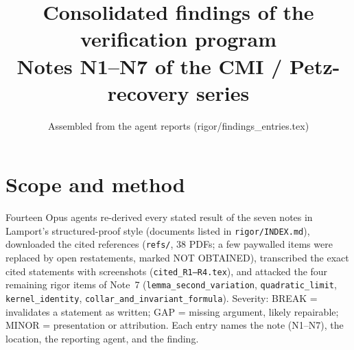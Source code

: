 \documentclass[11pt]{article}
\title{Consolidated findings of the verification program\\[0.3em]\large Notes N1--N7 of the CMI / Petz-recovery series}\author{}\date{Assembled from the agent reports (rigor/findings\_entries.tex)}
\begin{document}
\maketitle\tableofcontents\clearpage
\section{Scope and method}
Fourteen Opus agents re-derived every stated result of the seven notes in Lamport's structured-proof style (documents listed in \texttt{rigor/INDEX.md}), downloaded the cited references (\texttt{refs/}, 38 PDFs; a few paywalled items were replaced by open restatements, marked NOT OBTAINED), transcribed the exact cited statements with screenshots (\texttt{cited\_R1--R4.tex}), and attacked the four remaining rigor items of Note~7 (\texttt{lemma\_second\_variation}, \texttt{quadratic\_limit}, \texttt{kernel\_identity}, \texttt{collar\_and\_invariant\_formula}). Severity: BREAK = invalidates a statement as written; GAP = missing argument, likely repairable; MINOR = presentation or attribution. Each entry names the note (N1--N7), the location, the reporting agent, and the finding.
\end{document}
